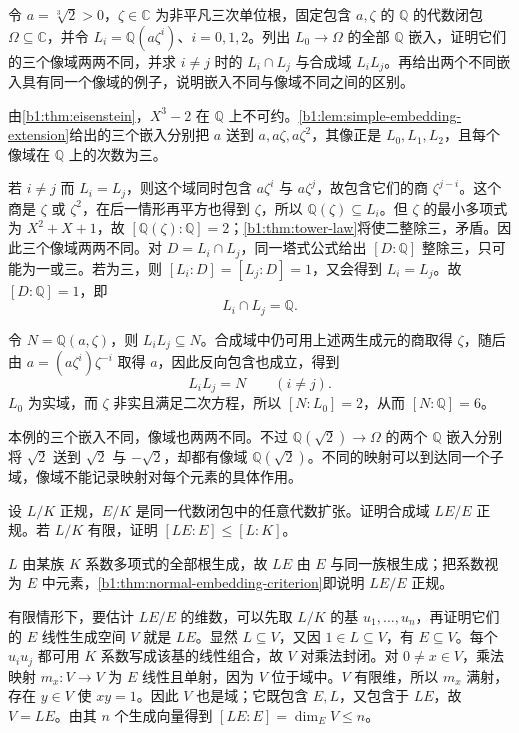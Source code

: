 \begin{exercise}\label{b1:ex:15-7}
	令 \(a=\sqrt[3]2>0\)，\(\zeta\in\mathbb C\) 为非平凡三次单位根，固定包含 \(a,\zeta\) 的 \(\mathbb Q\) 的代数闭包 \(\Omega\subseteq\mathbb C\)，并令 \(L_i=\mathbb Q(a\zeta^i)\)、\(i=0,1,2\)。列出 \(L_0\rightarrow\Omega\) 的全部 \(\mathbb Q\) 嵌入，证明它们的三个像域两两不同，并求 \(i\neq j\) 时的 \(L_i\cap L_j\) 与合成域 \(L_iL_j\)。再给出两个不同嵌入具有同一个像域的例子，说明嵌入不同与像域不同之间的区别。
\end{exercise}
\begin{solution}
	由\cref{b1:thm:eisenstein}，\(X^3-2\) 在 \(\mathbb Q\) 上不可约。\cref{b1:lem:simple-embedding-extension}给出的三个嵌入分别把 \(a\) 送到 \(a,a\zeta,a\zeta^2\)，其像正是 \(L_0,L_1,L_2\)，且每个像域在 \(\mathbb Q\) 上的次数为三。

	若 \(i\neq j\) 而 \(L_i=L_j\)，则这个域同时包含 \(a\zeta^i\) 与 \(a\zeta^j\)，故包含它们的商 \(\zeta^{j-i}\)。这个商是 \(\zeta\) 或 \(\zeta^2\)，在后一情形再平方也得到 \(\zeta\)，所以 \(\mathbb Q(\zeta)\subseteq L_i\)。但 \(\zeta\) 的最小多项式为 \(X^2+X+1\)，故 \([\mathbb Q(\zeta):\mathbb Q]=2\)；\cref{b1:thm:tower-law}将使二整除三，矛盾。因此三个像域两两不同。对 \(D=L_i\cap L_j\)，同一塔式公式给出 \([D:\mathbb Q]\) 整除三，只可能为一或三。若为三，则 \([L_i:D]=[L_j:D]=1\)，又会得到 \(L_i=L_j\)。故 \([D:\mathbb Q]=1\)，即
	\[
		L_i\cap L_j=\mathbb Q.
	\]

	令 \(N=\mathbb Q(a,\zeta)\)，则 \(L_iL_j\subseteq N\)。合成域中仍可用上述两生成元的商取得 \(\zeta\)，随后由 \(a=(a\zeta^i)\zeta^{-i}\) 取得 \(a\)，因此反向包含也成立，得到
	\[
		L_iL_j=N\qquad(i\neq j).
	\]
	\(L_0\) 为实域，而 \(\zeta\) 非实且满足二次方程，所以 \([N:L_0]=2\)，从而 \([N:\mathbb Q]=6\)。

	本例的三个嵌入不同，像域也两两不同。不过 \(\mathbb Q(\sqrt2)\rightarrow\Omega\) 的两个 \(\mathbb Q\) 嵌入分别将 \(\sqrt2\) 送到 \(\sqrt2\) 与 \(-\sqrt2\)，却都有像域 \(\mathbb Q(\sqrt2)\)。不同的映射可以到达同一个子域，像域不能记录映射对每个元素的具体作用。
\end{solution}

\begin{exercise}\label{b1:ex:15-8}
	设 \(L/K\) 正规，\(E/K\) 是同一代数闭包中的任意代数扩张。证明合成域 \(LE/E\) 正规。若 \(L/K\) 有限，证明 \([LE:E]\leq[L:K]\)。
\end{exercise}
\begin{solution}
	\(L\) 由某族 \(K\) 系数多项式的全部根生成，故 \(LE\) 由 \(E\) 与同一族根生成；把系数视为 \(E\) 中元素，\cref{b1:thm:normal-embedding-criterion}即说明 \(LE/E\) 正规。

	有限情形下，要估计 \(LE/E\) 的维数，可以先取 \(L/K\) 的基 \(u_1,\ldots,u_n\)，再证明它们的 \(E\) 线性生成空间 \(V\) 就是 \(LE\)。显然 \(L\subseteq V\)，又因 \(1\in L\subseteq V\)，有 \(E\subseteq V\)。每个 \(u_iu_j\) 都可用 \(K\) 系数写成该基的线性组合，故 \(V\) 对乘法封闭。对 \(0\neq x\in V\)，乘法映射 \(m_x:V\rightarrow V\) 为 \(E\) 线性且单射，因为 \(V\) 位于域中。\(V\) 有限维，所以 \(m_x\) 满射，存在 \(y\in V\) 使 \(xy=1\)。因此 \(V\) 也是域；它既包含 \(E,L\)，又包含于 \(LE\)，故 \(V=LE\)。由其 \(n\) 个生成向量得到 \([LE:E]=\dim_EV\leq n\)。
\end{solution}

